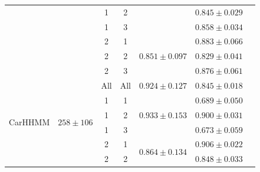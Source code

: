 \documentclass{article}
\begin{document}
\begin{center}
{\begin{tabular}{ccccccc}
                            &                                    & 1                             & 2                                &                                   & $0.845 \pm 0.029$                       \\ 
                            &                                    & 1                             & 3                                &                                   & $0.858 \pm 0.034$                       \\
                            &                                    & 2                             & 1                                & \multirow{3}{*}{$0.851\pm0.097$}    & $0.883 \pm 0.066$                       \\ 
                            &                                    & 2                             & 2                                &                                   & $0.829 \pm 0.041$                       \\
                            &                                    & 2                             & 3                                &                                   & $0.876 \pm 0.061$                       \\ \hline
\multirow{7}{*}{CarHHMM}    & \multirow{7}{*}{$258 \pm 106$}   & All                           & All                              & $0.924 \pm 0.127$                   & $0.845 \pm 0.018$                       \\
                            &                                    & 1                             & 1                                & \multirow{3}{*}{$0.933\pm0.153$}    & $0.689 \pm 0.050$                       \\ 
                            &                                    & 1                             & 2                                &                                   & $0.900 \pm 0.031$                       \\ 
                            &                                    & 1                             & 3                                &                                   & $0.673 \pm 0.059$                       \\
                            &                                    & 2                             & 1                                & \multirow{3}{*}{$0.864\pm0.134$}    & $0.906 \pm 0.022$                       \\ 
                            &                                    & 2                             & 2                                &                                   & $0.848 \pm 0.033$                       \\

\end{tabular}}
\end{center}
\end{document}
